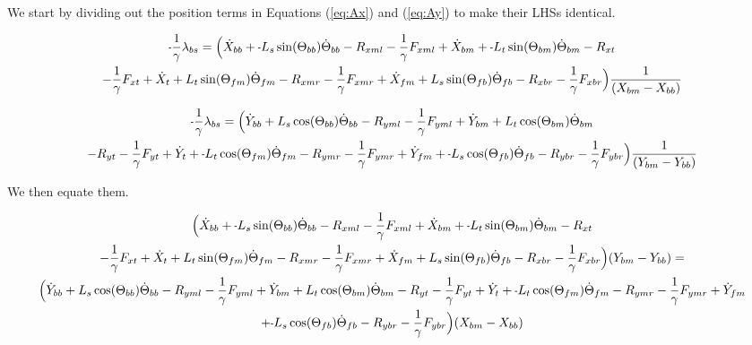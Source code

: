 \documentclass[11pt, landscape]{article}
\newcommand{\mn}{\scalebox{0.7}[1.0]{-}}
\begin{document}
We start by dividing out the position terms in Equations (\ref{eq:Ax}) and (\ref{eq:Ay}) to make their LHSs identical.

\begin{multline}
\mn\frac{1}{\gamma}\lambda_{bs} =
\Big(\dot{X}_{bb} + \mn L_{s}\sin(\Theta_{bb})\dot{\Theta}_{bb} - R_{xml} - \frac{1}{\gamma}F_{xml} + \dot{X}_{bm} + \mn L_{t}\sin(\Theta_{bm})\dot{\Theta}_{bm} - R_{xt } \\
- \frac{1}{\gamma}F_{xt } + \dot{X}_{t } + L_{t}\sin(\Theta_{fm})\dot{\Theta}_{fm} - R_{xmr}
-\frac{1}{\gamma}F_{xmr} + \dot{X}_{fm} + L_{s}\sin(\Theta_{fb})\dot{\Theta}_{fb} - R_{xbr} - \frac{1}{\gamma}F_{xbr}\Big)\frac{1}{(X_{bm} - X_{bb})}
\end{multline}

\begin{multline}
\mn\frac{1}{\gamma}\lambda_{bs} =
\Big( \dot{Y}_{bb} + L_{s}\cos(\Theta_{bb})\dot{\Theta}_{bb} - R_{yml} - \frac{1}{\gamma}F_{yml} + \dot{Y}_{bm} + L_{t}\cos(\Theta_{bm})\dot{\Theta}_{bm} \\
- R_{yt} - \frac{1}{\gamma}F_{yt } + \dot{Y}_{t } + \mn L_{t}\cos(\Theta_{fm})\dot{\Theta}_{fm} - R_{ymr} - \frac{1}{\gamma}F_{ymr} + \dot{Y}_{fm}
+ \mn L_{s}\cos(\Theta_{fb})\dot{\Theta}_{fb} - R_{ybr} - \frac{1}{\gamma}F_{ybr}\Big)\frac{1}{(Y_{bm} - Y_{bb})}
\end{multline}

We then equate them.

\begin{multline}
\Big(\dot{X}_{bb} + \mn L_{s}\sin(\Theta_{bb})\dot{\Theta}_{bb} - R_{xml} - \frac{1}{\gamma}F_{xml} + \dot{X}_{bm} + \mn L_{t}\sin(\Theta_{bm})\dot{\Theta}_{bm} - R_{xt } \\
- \frac{1}{\gamma}F_{xt } + \dot{X}_{t } + L_{t}\sin(\Theta_{fm})\dot{\Theta}_{fm} - R_{xmr}
-\frac{1}{\gamma}F_{xmr} + \dot{X}_{fm} + L_{s}\sin(\Theta_{fb})\dot{\Theta}_{fb} - R_{xbr} - \frac{1}{\gamma}F_{xbr}\Big)(Y_{bm} - Y_{bb}) = \\
\Big( \dot{Y}_{bb} + L_{s}\cos(\Theta_{bb})\dot{\Theta}_{bb} - R_{yml} - \frac{1}{\gamma}F_{yml} + \dot{Y}_{bm} + L_{t}\cos(\Theta_{bm})\dot{\Theta}_{bm}
- R_{yt} - \frac{1}{\gamma}F_{yt } + \dot{Y}_{t } + \mn L_{t}\cos(\Theta_{fm})\dot{\Theta}_{fm} - R_{ymr} - \frac{1}{\gamma}F_{ymr} + \dot{Y}_{fm} \\
+ \mn L_{s}\cos(\Theta_{fb})\dot{\Theta}_{fb} - R_{ybr} - \frac{1}{\gamma}F_{ybr}\Big)(X_{bm} - X_{bb})
\end{multline}
\end{document}
